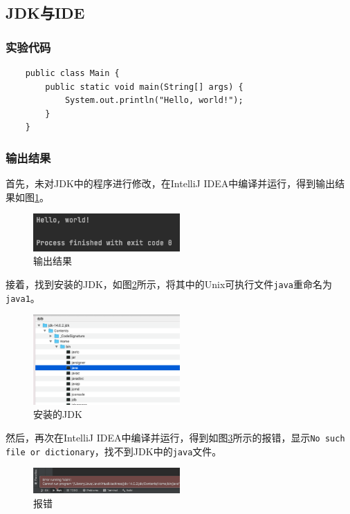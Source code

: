 \documentclass[11pt]{homework}
\begin{document}

\subsection*{JDK与IDE}

\subsubsection*{实验代码}

\lstset{language=java}
  \begin{lstlisting}
    public class Main {
        public static void main(String[] args) {
            System.out.println("Hello, world!");
        }
    }
  \end{lstlisting}

\subsubsection*{输出结果}

首先，未对JDK中的程序进行修改，在IntelliJ IDEA中编译并运行，得到输出结果如图\ref{jdk_ide_1}。
\begin{figure}
  \centering
  \includegraphics[width=0.5\textwidth]{jdk_ide_1}
  \caption{输出结果}
  \label{jdk_ide_1}
\end{figure}

接着，找到安装的JDK，如图\ref{jdk}所示，将其中的Unix可执行文件\verb|java|重命名为\verb|java1|。
\begin{figure}
  \centering
  \includegraphics[width=0.5\textwidth]{jdk}
  \caption{安装的JDK}
  \label{jdk}
\end{figure}

然后，再次在IntelliJ IDEA中编译并运行，得到如图\ref{error_running}所示的报错，显示\verb|No such file or dictionary|，找不到JDK中的\verb|java|文件。
\begin{figure}
  \centering
  \includegraphics[width=0.5\textwidth]{error_running}
  \caption{报错}
  \label{error_running}
\end{figure}
\end{document}
